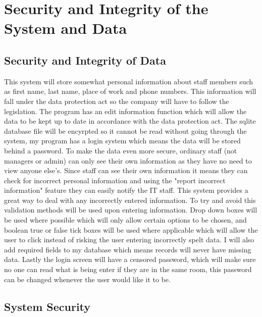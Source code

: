 \newpage

\section{Security and Integrity of the System and Data}

\subsection{Security and Integrity of Data}

This system will store somewhat personal information about staff members such as first name, last name, place of work and phone numbers. This information will fall under the data protection act so the company will have to follow the legislation. The program has an edit information function which will allow the data to be kept up to date in accordance with the data protection act. The sqlite database file will be encyrpted so it cannot be read without going through the system, my program has a login system which means the data will be stored behind a password. To make the data even more secure, ordinary staff (not managers or admin) can only see their own information as they have no need to view anyone else's. Since staff can see their own information it means they can check for incorrect personal information and using the "report incorrect information" feature they can easily notify the IT staff. This system provides a great way to deal with any incorrectly entered information. To try and avoid this validation methods will be used upon entering information. Drop down boxes will be used where possible which will only allow certain options to be chosen, and boolean true or false tick boxes will be used where applicable which will allow the user to click instead of risking the user entering incorrectly spelt data. I will also add required fields to my database which means records will never have missing data. Lastly the login screen will have a censored password, which will make sure no one can read what is being enter if they are in the same room, this password can be changed whenever the user would like it to be. 

\subsection{System Security}

